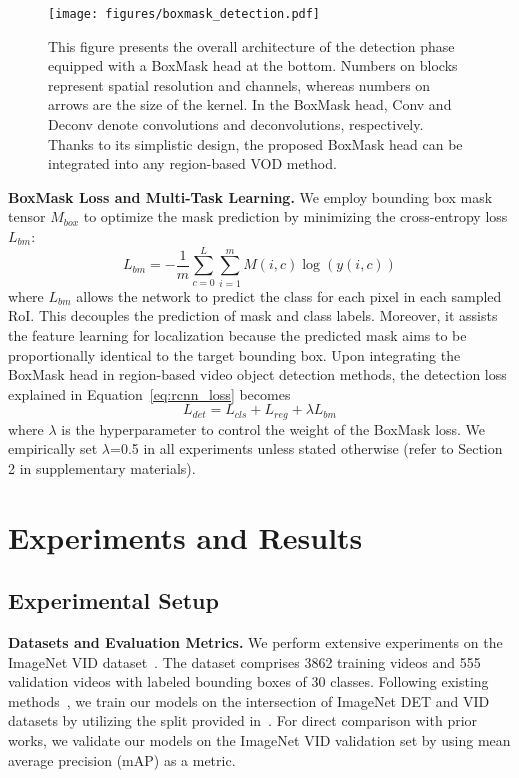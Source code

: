 \documentclass[10pt,twocolumn,letterpaper]{article}
\begin{document}
\begin{figure}
\centering
\texttt{[image: figures/boxmask\_detection.pdf]}
\caption{This figure presents the overall architecture of the detection phase equipped with a BoxMask head at the bottom. Numbers on blocks represent spatial resolution and channels, whereas numbers on arrows are the size of the kernel. In the BoxMask head, Conv and Deconv denote convolutions and deconvolutions, respectively. Thanks to its simplistic design, the proposed BoxMask head can be integrated into any region-based VOD method.}
\label{fig:boxmask_detection}
\vspace{-10pt}
\end{figure}


\vspace{3pt}
\noindent \textbf{BoxMask Loss and Multi-Task Learning.}
We employ bounding box mask tensor $M_{box}$ to optimize the mask prediction by minimizing the cross-entropy loss $L_{bm}$:
\begin{equation}
\label{eq:ce_loss}
    L_{bm} = -\frac{1}{m} \sum_{c=0}^{L}\sum_{i=1}^{m}M(i,c)\log (y(i,c))
\end{equation}
where $L_{bm}$ allows the network to predict the class for each pixel in each sampled RoI. This decouples the prediction of mask and class labels. Moreover, it assists the feature learning for localization because the predicted mask aims to be proportionally identical to the target bounding box. Upon integrating the BoxMask head in region-based video object detection methods, the detection loss explained in Equation~\ref{eq:rcnn_loss} becomes
\begin{equation}
\label{eq:loss_function}
    L_{det} = L_{cls} + L_{reg} + \lambda L_{bm} 
\end{equation}
where $\lambda$ is the hyperparameter to control the weight of the BoxMask loss. We empirically set $\lambda$=0.5 in all experiments unless stated otherwise (refer to Section 2 in supplementary materials). 

\section{Experiments and Results}

\subsection{Experimental Setup}

\vspace{3pt}
\noindent \textbf{Datasets and Evaluation Metrics.}
We perform extensive experiments on the ImageNet VID dataset~\cite{russakovsky2015imagenet}. The dataset comprises 3862 training videos and 555 validation videos with labeled bounding boxes of 30 classes. Following existing methods~\cite{wu2019sequence, gong2021temporal, zhu2017flow, zhu2017deep}, we train our models on the intersection of ImageNet DET and VID datasets\cite{russakovsky2015imagenet} by utilizing the split provided in~\cite{zhu2017flow}. For direct comparison with prior works, we validate our models on the ImageNet VID validation set by using mean average precision (mAP) as a metric. 
\end{document}
